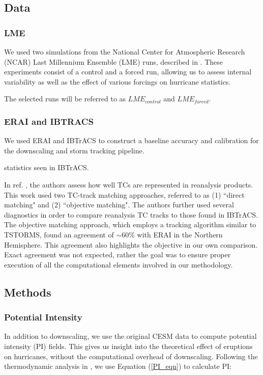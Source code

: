 \subsection{Data}
\subsubsection{LME}
We used two simulations from the National Center for Atmospheric Research (NCAR) Last Millennium Ensemble (LME) runs, described in \cite{gcm_lme}. These experiments consist of a control and a forced run, allowing us to assess internal variability as well as the effect of various forcings on hurricane statistics.



The selected runs will be referred to as $LME_{control}$ and $LME_{forced}$.



\subsubsection{ERAI and IBTRACS}
\label{erai}
We used ERAI and IBTrACS to construct a baseline accuracy and calibration for the downscaling and storm tracking pipeline.



statistics seen in IBTrACS.
\par



\par
In ref. \cite{hodges2017well}, the authors assess how well TCs are represented in reanalysis products. This work used two TC-track matching approaches, referred to as (1) ``direct matching" and (2) ``objective matching". The authors further used several diagnostics in order to compare reanalysis TC tracks to those found in IBTrACS. The objective matching approach, which employs a tracking algorithm similar to TSTORMS, found an agreement of ${\sim}60\%$ with ERAI in the Northern Hemisphere. This agreement also highlights the objective in our own comparison. Exact agreement was not expected, rather the goal was to ensure proper execution of all the computational elements involved in our methodology. 
\subsection{Methods}
\subsubsection{Potential Intensity}
In addition to downscaling, we use the original CESM data to compute potential intensity (PI) fields. This gives us insight into the theoretical effect of eruptions on hurricanes, without the computational overhead of downscaling. Following the thermodynamic analysis in \cite{pi_ke}, we use Equation (\ref{PI_eqn}) to calculate PI:

